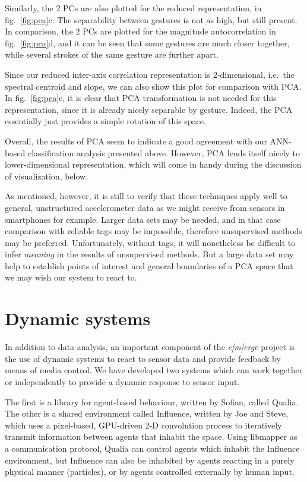 \documentclass{article}
\newcommand{\emerge}{\emph{e[m]erge}\xspace}
\begin{document}
Similarly, the 2 PCs are also plotted for the reduced representation,
in fig.~\ref{fig:pca}c.
The separability between gestures is not as high, but still present.
In comparison, the 2 PCs are plotted for the magnitude autocorrelation
in fig.~\ref{fig:pca}d, and it can be seen that some gestures are much
closer together, while several strokes of the same gesture are further
apart.

Since our reduced inter-axis correlation representation is
2-dimensional, i.e.\ the spectral centroid and slope, we can also show
this plot for comparison with PCA.
In fig.~\ref{fig:pca}e, it is clear that PCA transformation is not
needed for this representation, since it is already nicely separable
by gesture.
Indeed, the PCA essentially just provides a simple rotation of this
space.

Overall, the results of PCA seem to indicate a good agreement with our
ANN-based classification analysis presented above.
However, PCA lends itself nicely to lower-dimensional representation,
which will come in handy during the discussion of visualization,
below.

As mentioned, however, it is still to verify that these techniques
apply well to general, unstructured accelerometer data as we might
receive from sensors in smartphones for example.
Larger data sets may be needed, and in that case comparison with
reliable tags may be impossible, therefore unsupervised methods may be
preferred.
Unfortunately, without tags, it will nonetheless be difficult to infer
\emph{meaning} in the results of unsupervised methods.
But a large data set may help to establish points of interest and
general boundaries of a PCA space that we may wish our system to react
to.

\section{Dynamic systems}

In addition to data analysis, an important component of the \emerge
project is the use of dynamic systems to react to sensor data and
provide feedback by means of media control.
We have developed two systems which can work together or independently
to provide a dynamic response to sensor input.

The first is a library for agent-based behaviour, written by Sofian,
called Qualia.
The other is a shared environment called Influence, written by Joe and
Steve, which uses a pixel-based, GPU-driven 2-D convolution process to
iteratively transmit information between agents that inhabit the
space.
Using libmapper as a communication protocol, Qualia can control agents
which inhabit the Influence environment, but Influence can also be
inhabited by agents reacting in a purely physical manner (particles),
or by agents controlled externally by human input.
\end{document}
